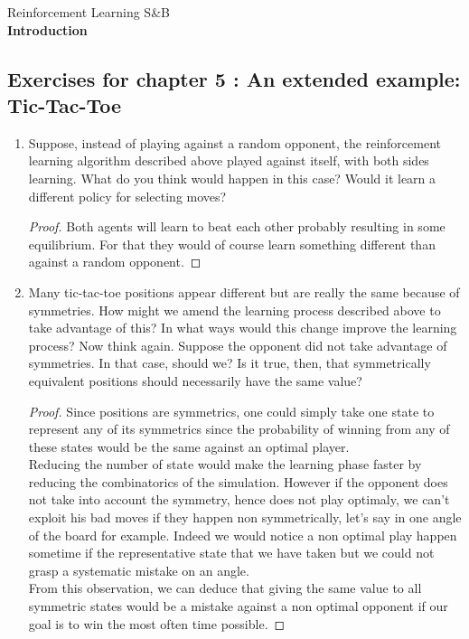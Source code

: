 \documentclass[]{book}
\theoremstyle{definition}
\begin{document}
\begin{center}
{\Large Reinforcement Learning \hspace{0.5cm} S\&B}\\
\textbf{Introduction}\\ %
\end{center}

\vspace{0.2 cm}


\subsection*{Exercises for chapter 5 : An extended example: Tic-Tac-Toe}

\begin{enumerate}
\item
    Suppose, instead of playing against a random opponent, the reinforcement learning algorithm described above played against itself, with both sides learning. What do you think would happen in this case? Would it learn a different policy for selecting moves?
    \begin{proof}
	    Both agents will learn to beat each other probably resulting in some equilibrium. For that they would of course learn something different than against a random opponent.
    \end{proof}

\item
    Many tic-tac-toe positions appear different but are really the same because of symmetries. How might we amend the learning process described above to take advantage of this? In what ways would this change improve the learning process? Now think again. Suppose the opponent did not take advantage of symmetries. In that case, should we? Is it true, then, that symmetrically equivalent positions should necessarily have the same value?
    \begin{proof}
        Since positions are symmetrics, one could simply take one state to represent any of its symmetrics since the probability of winning from any of these states would be the same against an optimal player.\\
        Reducing the number of state would make the learning phase faster by reducing the combinatorics of the simulation. However if the opponent does not take into account the symmetry, hence does not play optimaly, we can't exploit his bad moves if they happen non symmetrically, let's say in one angle of the board for example. Indeed we would notice a non optimal play happen sometime if the representative state that we have taken but we could not grasp a systematic mistake on an angle.\\
        From this observation, we can deduce that giving the same value to all symmetric states would be a mistake against a non optimal opponent if our goal is to win the most often time possible.
    \end{proof}


\end{enumerate}
\end{document}
